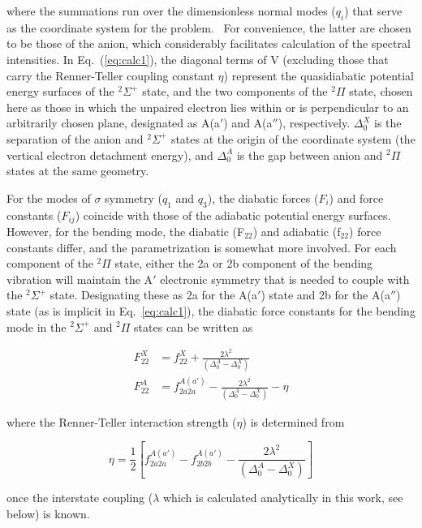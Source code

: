 \documentclass[aip,graphicx]{revtex4-1}
\begin{document}
where the summations run over the dimensionless normal modes ($q_i$) that serve as the coordinate system for the problem.~\cite{sta21,car00} For convenience, the latter are chosen to be those of the anion, which considerably facilitates calculation of the spectral intensities.  In Eq.~(\ref{eq:calc1}), the diagonal terms of V (excluding those that carry the Renner-Teller coupling constant $\eta$) represent the quasidiabatic potential energy surfaces of the $^2\Sigma^+$ state, and the two components of the $^2\Pi$ state, chosen here as those in which the unpaired electron lies within or is perpendicular to an arbitrarily chosen plane, designated as A(a$'$) and A(a$''$), respectively. $\Delta_0^X$ is the separation of the anion and $^2\Sigma^+$ states at the origin of the coordinate system (the vertical electron detachment energy), and $\Delta_0^{A}$ is the gap between anion and $^2\Pi$ states at the same geometry.   

For the modes of $\sigma$ symmetry ($q_1$ and $q_3$), the diabatic forces ($F_i$) and force constants ($F_{ij}$) coincide with those of the adiabatic potential energy surfaces.   However, for the bending mode, the diabatic (F$_{22}$) and adiabatic (f$_{22}$) force constants differ, and the parametrization is somewhat more involved.   For each component of the $^2\Pi$ state, either the 2a or 2b component of the bending vibration will maintain the A$'$ electronic symmetry that is needed to couple with the $^2\Sigma^+$ state.  Designating these as 2a for the A(a$'$) state and 2b for the A(a$''$) state (as is implicit in Eq.~\ref{eq:calc1}), the diabatic force constants for the bending mode in the $^2\Sigma^+$ and $^2\Pi$ states can be written as 

\begin{align}
F_{22}^X &= f_{22}^X+\frac{2\lambda^2}{(\Delta_0^A-\Delta_0^X)}\\
F_{22}^A &= f_{2a2a}^{A(a')}-\frac{2\lambda^2}{(\Delta_0^A-\Delta_0^X)}-\eta
\label{eq:calc2}
\end{align}

where the Renner-Teller interaction strength ($\eta$) is determined from 

\begin{equation}
\eta = \frac{1}{2}\left[ f_{2a2a}^{A(a')}-f_{2b2b}^{A(a')}-\frac{2\lambda^2}{(\Delta_0^A-\Delta_0^X)}\right]
\label{eq:calc3}
\end{equation}

once the interstate coupling ($\lambda$ which is calculated analytically in this work, see below) is known.
\end{document}
